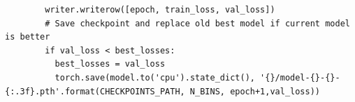 \begin{longlisting}
\begin{verbatim}
        writer.writerow([epoch, train_loss, val_loss])
        # Save checkpoint and replace old best model if current model is better
        if val_loss < best_losses:
          best_losses = val_loss
          torch.save(model.to('cpu').state_dict(), '{}/model-{}-{}-{:.3f}.pth'.format(CHECKPOINTS_PATH, N_BINS, epoch+1,val_loss))

  \end{verbatim}
\end{longlisting}

